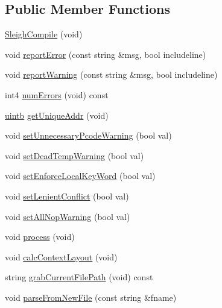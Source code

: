 \subsection*{Public Member Functions}
\begin{DoxyCompactItemize}
\item 
\mbox{\hyperlink{class_sleigh_compile_a7a400fe5185fa571983e19708668d70f}{Sleigh\+Compile}} (void)
\item 
void \mbox{\hyperlink{class_sleigh_compile_a0ab2e290f1b8fcdeaa6e78d5d4e9e9ff}{report\+Error}} (const string \&msg, bool includeline)
\item 
void \mbox{\hyperlink{class_sleigh_compile_af7bc0abd8fab8c9ec3feef83fa14cd54}{report\+Warning}} (const string \&msg, bool includeline)
\item 
int4 \mbox{\hyperlink{class_sleigh_compile_a5d784f8080b11074ee3eb7be024a4acb}{num\+Errors}} (void) const
\item 
\mbox{\hyperlink{types_8h_a2db313c5d32a12b01d26ac9b3bca178f}{uintb}} \mbox{\hyperlink{class_sleigh_compile_a32f70f8b08cba76013faffe61966a080}{get\+Unique\+Addr}} (void)
\item 
void \mbox{\hyperlink{class_sleigh_compile_aea70d98ce950acdc4530ffdf5a6a2f31}{set\+Unnecessary\+Pcode\+Warning}} (bool val)
\item 
void \mbox{\hyperlink{class_sleigh_compile_aa206cd0acacbdbf18d38cc0138926049}{set\+Dead\+Temp\+Warning}} (bool val)
\item 
void \mbox{\hyperlink{class_sleigh_compile_a32aa844100006a43c9ecc9e4273337b4}{set\+Enforce\+Local\+Key\+Word}} (bool val)
\item 
void \mbox{\hyperlink{class_sleigh_compile_abffd3f40ea361e9d75de94285738c7de}{set\+Lenient\+Conflict}} (bool val)
\item 
void \mbox{\hyperlink{class_sleigh_compile_a4a1ac06e98efdf630947f401cb6c355c}{set\+All\+Nop\+Warning}} (bool val)
\item 
void \mbox{\hyperlink{class_sleigh_compile_a2f2a10a6cc1f1b03f02ebd2f63a2264f}{process}} (void)
\item 
void \mbox{\hyperlink{class_sleigh_compile_abf73e7515a8035b45682451849f2b5be}{calc\+Context\+Layout}} (void)
\item 
string \mbox{\hyperlink{class_sleigh_compile_afe364bd89e5cc56e0e6579138d214772}{grab\+Current\+File\+Path}} (void) const
\item 
void \mbox{\hyperlink{class_sleigh_compile_aaf7be52d56942f5de10d908e00826d22}{parse\+From\+New\+File}} (const string \&fname)

\end{DoxyCompactItemize}
